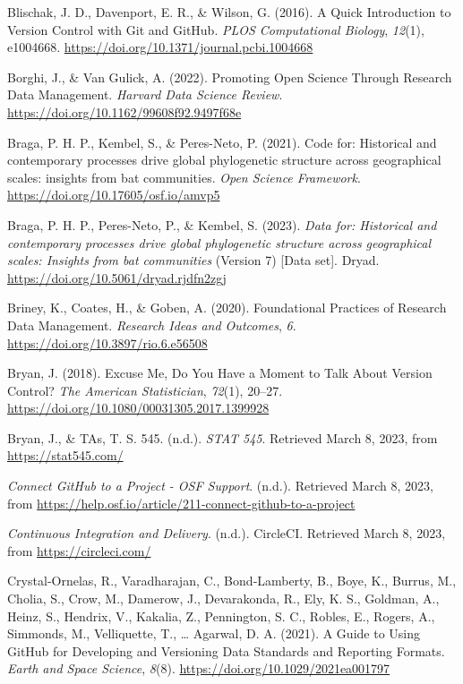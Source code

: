 \begin{CSLReferences}{1}{0}
\leavevmode{}%
Blischak, J. D., Davenport, E. R., \& Wilson, G. (2016). A Quick Introduction to Version Control with Git and GitHub. \emph{PLOS Computational Biology}, \emph{12}(1), e1004668. \url{https://doi.org/10.1371/journal.pcbi.1004668}

\leavevmode{}%
Borghi, J., \& Van Gulick, A. (2022). Promoting Open Science Through Research Data Management. \emph{Harvard Data Science Review}. \url{https://doi.org/10.1162/99608f92.9497f68e}

\leavevmode{}%
Braga, P. H. P., Kembel, S., \& Peres-Neto, P. (2021). Code for: Historical and contemporary processes drive global phylogenetic structure across geographical scales: insights from bat communities. \emph{Open Science Framework}. \url{https://doi.org/10.17605/osf.io/amvp5}

\leavevmode{}%
Braga, P. H. P., Peres-Neto, P., \& Kembel, S. (2023). \emph{Data for: Historical and contemporary processes drive global phylogenetic structure across geographical scales: Insights from bat communities} (Version 7) {[}Data set{]}. Dryad. \url{https://doi.org/10.5061/dryad.rjdfn2zgj}

\leavevmode{}%
Briney, K., Coates, H., \& Goben, A. (2020). Foundational Practices of Research Data Management. \emph{Research Ideas and Outcomes}, \emph{6}. \url{https://doi.org/10.3897/rio.6.e56508}

\leavevmode{}%
Bryan, J. (2018). Excuse Me, Do You Have a Moment to Talk About Version Control? \emph{The American Statistician}, \emph{72}(1), 20--27. \url{https://doi.org/10.1080/00031305.2017.1399928}

\leavevmode{}%
Bryan, J., \& TAs, T. S. 545. (n.d.). \emph{STAT 545}. Retrieved March 8, 2023, from \url{https://stat545.com/}

\leavevmode{}%
\emph{Connect GitHub to a Project - OSF Support}. (n.d.). Retrieved March 8, 2023, from \url{https://help.osf.io/article/211-connect-github-to-a-project}

\leavevmode{}%
\emph{Continuous Integration and Delivery}. (n.d.). CircleCI. Retrieved March 8, 2023, from \url{https://circleci.com/}

\leavevmode{}%
Crystal‐Ornelas, R., Varadharajan, C., Bond‐Lamberty, B., Boye, K., Burrus, M., Cholia, S., Crow, M., Damerow, J., Devarakonda, R., Ely, K. S., Goldman, A., Heinz, S., Hendrix, V., Kakalia, Z., Pennington, S. C., Robles, E., Rogers, A., Simmonds, M., Velliquette, T., \ldots{} Agarwal, D. A. (2021). A Guide to Using GitHub for Developing and Versioning Data Standards and Reporting Formats. \emph{Earth and Space Science}, \emph{8}(8). \url{https://doi.org/10.1029/2021ea001797}


\end{CSLReferences}

